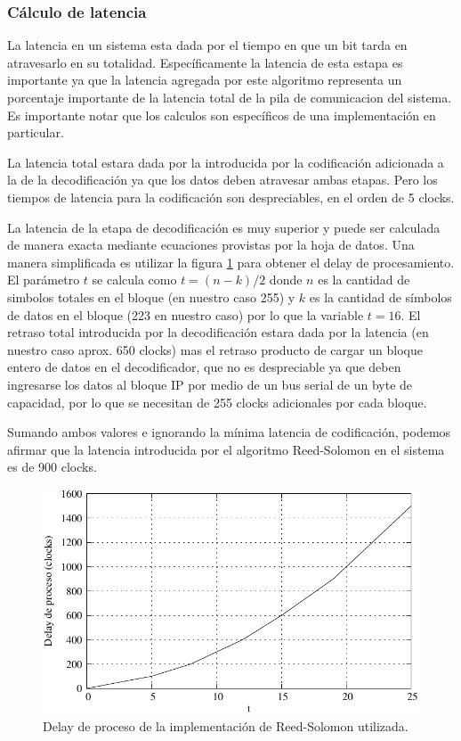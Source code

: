 \subsubsection{Cálculo de latencia}
La latencia en un sistema esta dada por el tiempo en que un bit tarda en atravesarlo en su totalidad. Específicamente la latencia de esta estapa es importante ya que la latencia agregada por este algoritmo representa un porcentaje importante de la latencia total de la pila de comunicacion del sistema. Es importante notar que los calculos son específicos de una implementación en particular. 

La latencia total estara dada por la introducida por la codificación adicionada a la de la decodificación ya que los datos deben atravesar ambas etapas. Pero los tiempos de latencia para la codificación son despreciables, en el orden de 5 clocks. 

La latencia de la etapa de decodificación es muy superior y puede ser calculada de manera exacta mediante ecuaciones provistas por la hoja de datos. Una manera simplificada es utilizar la figura \ref{fig_rslat} para obtener el delay de procesamiento. El parámetro $t$ se calcula como $t=(n-k)/2$ donde $n$ es la cantidad de simbolos totales en el bloque (en nuestro caso 255) y $k$ es la cantidad de símbolos de datos en el bloque (223 en nuestro caso) por lo que la variable $t=16$.  El retraso total introducida por la decodificación estara dada por la latencia (en nuestro caso aprox. 650 clocks) mas el retraso producto de cargar un bloque entero de datos en el decodificador, que no es despreciable ya que deben ingresarse los datos al bloque IP por medio de un bus serial de un byte de capacidad, por lo que se necesitan de 255 clocks adicionales por cada bloque. 

Sumando ambos valores e ignorando la mínima latencia de codificación, podemos afirmar que la latencia introducida por el algoritmo Reed-Solomon en el sistema es de 900 clocks.

\begin{figure}[t]
  \centering
  \includegraphics[width=0.6 \textwidth]{graphs/rsDelay.pdf} 
  \caption{Delay de proceso de la implementación de Reed-Solomon utilizada.}
  \label{fig_rslat}
\end{figure}


